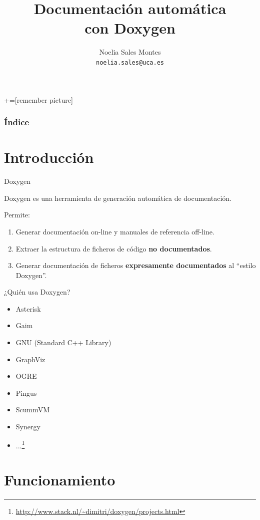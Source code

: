 \documentclass[12pt,xcolor=svgnames]{beamer}
\title[Doxygen]{Documentación automática\\ con Doxygen}
\author[Noelia Sales]{Noelia Sales Montes\\\texttt{noelia.sales@uca.es}}
\institute[DV - UCA]{Diseño de Videojuegos\\
Universidad de Cádiz}
\date{}
\begin{document}
+=[remember picture]
\everymath{\displaystyle}

\begin{frame}
 \titlepage
\end{frame}

\begin{frame}
\frametitle{Índice} 
\transboxin
\tableofcontents
\end{frame}

\section{Introducción}

\begin{frame}{Doxygen}
  \begin{center}
   {\large Doxygen es una herramienta de generación automática de
     documentación.}
 \end{center}

 \pause
 Permite:
 \begin{enumerate}
 \item<2-> Generar documentación on-line y manuales de referencia off-line.
 \item<3-> Extraer la estructura de ficheros de código \textbf{no
     documentados}.
 \item<4-> Generar documentación de ficheros \textbf{expresamente documentados}
   al ``estilo Doxygen''.
 \end{enumerate}
\end{frame}

\begin{frame}{¿Quién usa Doxygen?}
  \begin{itemize}
  \item Asterisk
  \item Gaim
  \item GNU (Standard C++ Library)
  \item GraphViz
  \item OGRE
  \item Pingus
  \item ScummVM
  \item Synergy
  \item ...\footnote{{\scriptsize \url{http://www.stack.nl/~dimitri/doxygen/projects.html}}}
  \end{itemize}
\end{frame}

\section{Funcionamiento}
\end{document}
